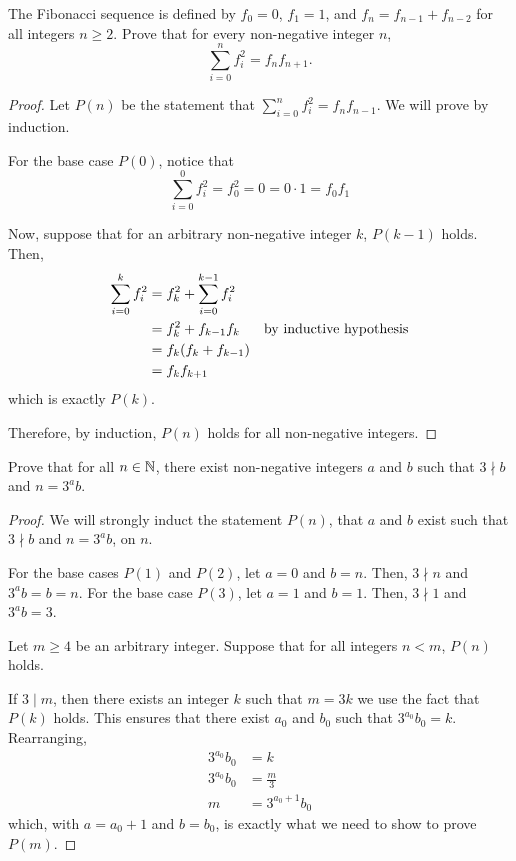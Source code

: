 \documentclass{agony}
\begin{document}
\question The Fibonacci sequence is defined by $f_0=0$, $f_1=1$,
and $f_n=f_{n-1}+f_{n-2}$ for all integers $n \geq 2$.
Prove that for every non-negative integer $n$,
\[ \sum_{i=0}^n f^2_i = f_n f_{n+1}.\]
\begin{proof}
  Let $P(n)$ be the statement that $\displaystyle\sum_{i=0}^n f^2_i = f_n f_{n-1}$.
  We will prove by induction.

  For the base case $P(0)$, notice that
  \[ \sum_{i=0}^0 f_i^2 = f_0^2 = 0 = 0\cdot 1 = f_0 f_1 \]

  Now, suppose that for an arbitrary non-negative integer $k$, $P(k-1)$ holds. Then,
  \begin{align*}
    \sum_{i=0}^k f^2_i & = f_k^2 + \sum_{i=0}^{k-1} f^2_i \\
                       & = f_k^2 + f_{k-1} f_k & \text{by inductive hypothesis}        \\
                       & = f_k(f_k + f_{k-1})             \\
                       & = f_k f_{k+1}
  \end{align*}
  which is exactly $P(k)$.

  Therefore, by induction, $P(n)$ holds for all non-negative integers.
\end{proof}


\question Prove that for all $n\in\mathbb{N}$, there exist non-negative integers $a$ and $b$ such that
$3 \nmid b$ and $n = 3^a b$.
\begin{proof}
  We will strongly induct the statement $P(n)$, that $a$ and $b$ exist such that $3 \nmid b$ and $n=3^a b$, on $n$.

  For the base cases $P(1)$ and $P(2)$, let $a=0$ and $b=n$.
  Then, $3 \nmid n$ and $3^a b = b = n$.
  For the base case $P(3)$, let $a=1$ and $b=1$.
  Then, $3 \nmid 1$ and $3^a b = 3$.

  Let $m \geq 4$ be an arbitrary integer.
  Suppose that for all integers $n < m$, $P(n)$ holds.

  If $3 \mid m$, then there exists an integer $k$ such that $m=3k$ we use the fact that $P(k)$ holds.
  This ensures that there exist $a_0$ and $b_0$ such that $3^{a_0}b_0 = k$. Rearranging,
  \begin{align*}
    3^{a_0}b_0 & = k            \\
    3^{a_0}b_0 & = \frac{m}{3}  \\
    m          & = 3^{a_0+1}b_0
  \end{align*}
  which, with $a=a_0+1$ and $b=b_0$, is exactly what we need to show to prove $P(m)$.
\end{proof}
\end{document}
